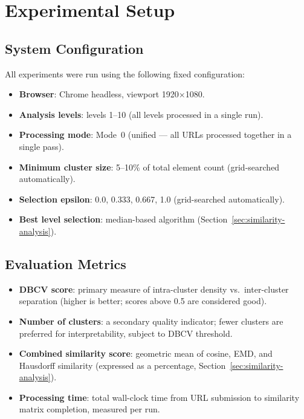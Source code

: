 \section{Experimental Setup}
\label{sec:experimental-setup}

\subsection{System Configuration}

All experiments were run using the following fixed configuration:

\begin{itemize}
    \item \textbf{Browser}: Chrome headless, viewport 1920$\times$1080.
    \item \textbf{Analysis levels}: levels 1--10 (all levels processed in a single run).
    \item \textbf{Processing mode}: Mode~0 (unified --- all URLs processed together in a single pass).
    \item \textbf{Minimum cluster size}: 5--10\% of total element count (grid-searched automatically).
    \item \textbf{Selection epsilon}: 0.0, 0.333, 0.667, 1.0 (grid-searched automatically).
    \item \textbf{Best level selection}: median-based algorithm (Section~\ref{sec:similarity-analysis}).
\end{itemize}

\subsection{Evaluation Metrics}

\begin{itemize}
    \item \textbf{DBCV score}: primary measure of intra-cluster density vs.\ inter-cluster separation (higher is better; scores above 0.5 are considered good).
    \item \textbf{Number of clusters}: a secondary quality indicator; fewer clusters are preferred for interpretability, subject to DBCV threshold.
    \item \textbf{Combined similarity score}: geometric mean of cosine, EMD, and Hausdorff similarity (expressed as a percentage, Section~\ref{sec:similarity-analysis}).
    \item \textbf{Processing time}: total wall-clock time from URL submission to similarity matrix completion, measured per run.
\end{itemize}

